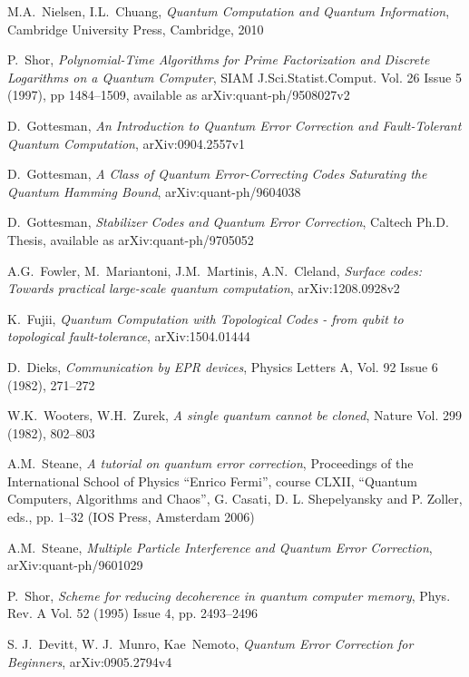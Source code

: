 \documentclass[a4paper, draft]{article}
\theoremstyle{own}
\theoremstyle{remark}
\begin{document}
\begin{thebibliography}{9}


M.A.~Nielsen, I.L.~Chuang, \emph{Quantum Computation and Quantum Information},
Cambridge University Press, Cambridge, 2010

P.~Shor, \emph{Polynomial-Time Algorithms for Prime Factorization and Discrete Logarithms on a Quantum Computer}, SIAM J.Sci.Statist.Comput. Vol. 26 Issue 5 (1997), pp 1484--1509, available as arXiv:quant-ph/9508027v2


D.~Gottesman, \emph{An Introduction to Quantum Error Correction and Fault-Tolerant Quantum Computation}, arXiv:0904.2557v1

D.~Gottesman, \emph{A Class of Quantum Error-Correcting Codes Saturating the Quantum Hamming Bound}, arXiv:quant-ph/9604038

D.~Gottesman, \emph{Stabilizer Codes and Quantum Error Correction}, Caltech Ph.D. Thesis, available as  arXiv:quant-ph/9705052

A.G.~Fowler, M.~Mariantoni, J.M.~Martinis, A.N.~Cleland, \emph{Surface codes: Towards practical large-scale quantum computation}, arXiv:1208.0928v2

K.~Fujii, \emph{Quantum Computation with Topological Codes - from qubit to topological fault-tolerance}, 	arXiv:1504.01444 

D.~Dieks, \emph{Communication by EPR devices}, Physics Letters A, Vol. 92 Issue 6 (1982), 271--272

W.K.~Wooters, W.H.~Zurek, \emph{A single quantum cannot be cloned}, Nature Vol. 299 (1982), 802--803

A.M.~Steane, \emph{A tutorial on quantum error correction}, Proceedings of the International School of Physics “Enrico Fermi”, course CLXII, “Quantum Computers,
Algorithms and Chaos”, G. Casati, D. L. Shepelyansky and P. Zoller, eds., pp. 1–32 (IOS Press, Amsterdam 2006)

A.M.~Steane, \emph{Multiple Particle Interference and Quantum Error Correction}, 	arXiv:quant-ph/9601029

P.~Shor, \emph{Scheme for reducing decoherence in quantum computer memory},
Phys. Rev. A Vol. 52 (1995) Issue 4, pp. 2493--2496 

S. J.~Devitt, W. J.~Munro, Kae~Nemoto, \emph{Quantum Error Correction for Beginners},
arXiv:0905.2794v4


\end{thebibliography}
\end{document}
